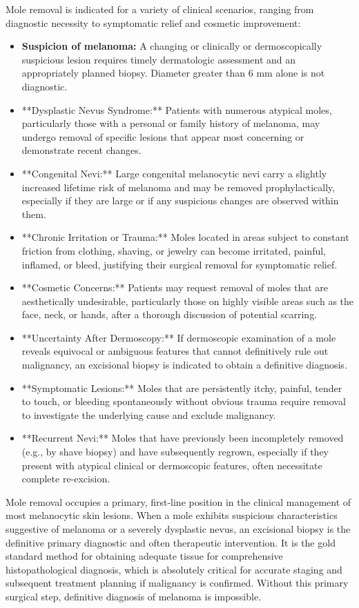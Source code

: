 Mole removal is indicated for a variety of clinical scenarios, ranging from diagnostic necessity to symptomatic relief and cosmetic improvement:

\begin{itemize}
  \item \textbf{Suspicion of melanoma:} A changing or clinically or dermoscopically suspicious lesion requires timely dermatologic assessment and an appropriately planned biopsy. Diameter greater than 6 mm alone is not diagnostic.
  \item **Dysplastic Nevus Syndrome:** Patients with numerous atypical moles, particularly those with a personal or family history of melanoma, may undergo removal of specific lesions that appear most concerning or demonstrate recent changes.
  \item **Congenital Nevi:** Large congenital melanocytic nevi carry a slightly increased lifetime risk of melanoma and may be removed prophylactically, especially if they are large or if any suspicious changes are observed within them.
  \item **Chronic Irritation or Trauma:** Moles located in areas subject to constant friction from clothing, shaving, or jewelry can become irritated, painful, inflamed, or bleed, justifying their surgical removal for symptomatic relief.
  \item **Cosmetic Concerns:** Patients may request removal of moles that are aesthetically undesirable, particularly those on highly visible areas such as the face, neck, or hands, after a thorough discussion of potential scarring.
  \item **Uncertainty After Dermoscopy:** If dermoscopic examination of a mole reveals equivocal or ambiguous features that cannot definitively rule out malignancy, an excisional biopsy is indicated to obtain a definitive diagnosis.
  \item **Symptomatic Lesions:** Moles that are persistently itchy, painful, tender to touch, or bleeding spontaneously without obvious trauma require removal to investigate the underlying cause and exclude malignancy.
  \item **Recurrent Nevi:** Moles that have previously been incompletely removed (e.g., by shave biopsy) and have subsequently regrown, especially if they present with atypical clinical or dermoscopic features, often necessitate complete re-excision.
\end{itemize}

Mole removal occupies a primary, first-line position in the clinical management of most melanocytic skin lesions. When a mole exhibits suspicious characteristics suggestive of melanoma or a severely dysplastic nevus, an excisional biopsy is the definitive primary diagnostic and often therapeutic intervention. It is the gold standard method for obtaining adequate tissue for comprehensive histopathological diagnosis, which is absolutely critical for accurate staging and subsequent treatment planning if malignancy is confirmed. Without this primary surgical step, definitive diagnosis of melanoma is impossible.


